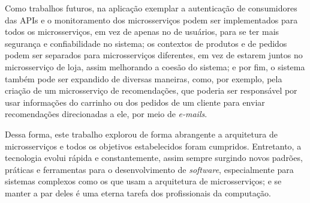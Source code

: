 Como trabalhos futuros, na aplicação exemplar a autenticação de consumidores das APIs e o monitoramento dos microsserviços podem ser implementados para todos os microsserviços, em vez de apenas no de usuários, para se ter mais segurança e confiabilidade no sistema; os contextos de produtos e de pedidos podem ser separados para microsserviços diferentes, em vez de estarem juntos no microsserviço de loja, assim melhorando a coesão do sistema; e por fim, o sistema também pode ser expandido de diversas maneiras, como, por exemplo, pela criação de um microsserviço de recomendações, 
que poderia ser responsável por usar informações do carrinho ou dos pedidos de um cliente para enviar recomendações direcionadas a ele, por meio de \emph{e-mails}.


Dessa forma, este trabalho explorou de forma abrangente a arquitetura de microsserviços e todos os objetivos estabelecidos foram cumpridos. Entretanto, a tecnologia evolui rápida e constantemente, assim sempre surgindo novos padrões, práticas e ferramentas para o desenvolvimento de \emph{software}, especialmente para sistemas complexos como os que usam a arquitetura de microsserviços; e se manter a par deles é uma eterna tarefa dos profissionais da computação.




